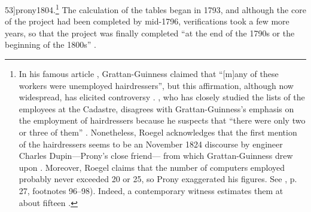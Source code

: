 \documentclass[version=last,draft=false,paper=A4,portrait,twoside=true,twocolumn=false,headinclude=false,footinclude=false,mpinclude=true,fontsize=12,BCOR=20mm,DIV=calc,pagesize=auto,open=right,chapterprefix=true,numbers=autoendperiod,headsepline=false,headings=twolinechapter,parskip=false]{scrbook}
\begin{document}
53]{prony1804}.\footnote{In his famous article ,
Grattan-Guinness claimed that ``[m]any of these workers were unemployed
hairdressers'', but this affirmation, although now widespread, has elicited
controversy \autocite[179]{grattan-guinness1990}. \textcite{roegel2011},
who has closely studied the lists of the employees at the Cadastre,
disagrees with Grattan-Guinness's emphasis on the employment of
hairdressers because he suspects that ``there were only two or three of
them'' \parencite[26]{roegel2011}. Nonetheless, Roegel acknowledges
that the first mention of the hairdressers seems to be an 
November 1824 discourse by engineer Charles Dupin---Prony's close friend---
from which Grattan-Guinness drew upon \parencite{dupin1824}. Moreover, Roegel
claims that the number of computers employed probably never exceeded 20 or
25, so Prony exaggerated his figures. See \textcite{roegel2011}, p. 27, footnotes
96--98). Indeed, a contemporary witness estimates them at about fifteen
\autocite[744]{laLande1803}.} The calculation of the tables began in 1793, and although the
core of the project had been completed by mid-1796, verifications took a
few more years, so that the project was finally completed ``at the end of
the 1790s or the beginning of the 1800s'' \autocite[37]{roegel2011}.
\end{document}

